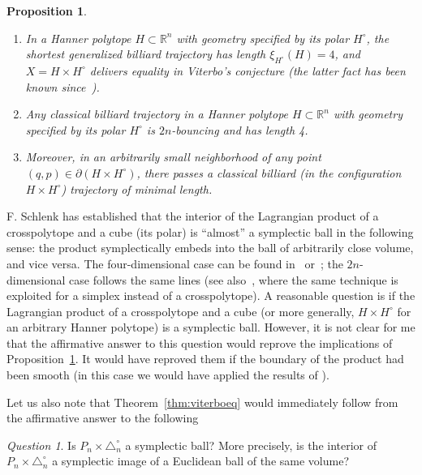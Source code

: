 \documentclass[12pt,a4paper,oneside]{amsart}
\newtheorem{proposition}[theorem]{Proposition}
\theoremstyle{definition}
\theoremstyle{remark}
\newtheorem{question}[theorem]{Question}
\numberwithin{equation}{section}
\begin{document}
\begin{proposition}
\label{prop:hanner}
\begin{enumerate}
\item
In a Hanner polytope $H \subset \mathbb{R}^n$ with geometry specified by its polar $H^{\circ}$, the shortest generalized billiard trajectory has length $\xi_{H^\circ}(H) = 4$, and $X = H\times H^\circ$ delivers equality in Viterbo's conjecture (the latter fact has been known since~\cite{artstein2014from}).

\item
Any classical billiard trajectory in a Hanner polytope $H \subset \mathbb{R}^n$ with geometry specified by its polar $H^{\circ}$ is $2n$-bouncing and has length 4.

\item
Moreover, in an arbitrarily small neighborhood of any point $(q,p) \in \partial (H \times H^{\circ})$, there passes a classical billiard (in the configuration $H \times H^{\circ}$) trajectory of minimal length.
\end{enumerate}
\end{proposition}

F. Schlenk has established that the interior of the Lagrangian product of a crosspolytope and a cube (its polar) is ``almost'' a symplectic ball in the following sense: the product symplectically embeds into the ball of arbitrarily close volume, and vice versa. The four-dimensional case can be found in~\cite[Lemma~3.1.8]{schlenk2005embedding} or~\cite[\S 4]{latschev2013gromov}; the $2n$-dimensional case follows the same lines (see also~\cite[Lemma~5.3.1]{schlenk2005embedding}, where the same technique is exploited for a simplex instead of a crosspolytope). A reasonable question is if the Lagrangian product of a crosspolytope and a cube (or more generally, $H\times H^\circ$ for an arbitrary Hanner polytope) is a symplectic ball. However, it is not clear for me that the affirmative answer to this question would reprove the implications of Proposition~\ref{prop:hanner}. It would have reproved them if the boundary of the product had been smooth (in this case we would have applied the results of \cite{paiva2014contact}).

Let us also note that Theorem~\ref{thm:viterboeq} would immediately follow from the affirmative answer to the following

\begin{question}
\label{ques:permutball}
Is $P_n \times \triangle_n^{\circ}$ a symplectic ball? More precisely, is the interior of $P_n \times \triangle_n^{\circ}$ a symplectic image of a Euclidean ball of the same volume?
\end{question}
\end{document}
